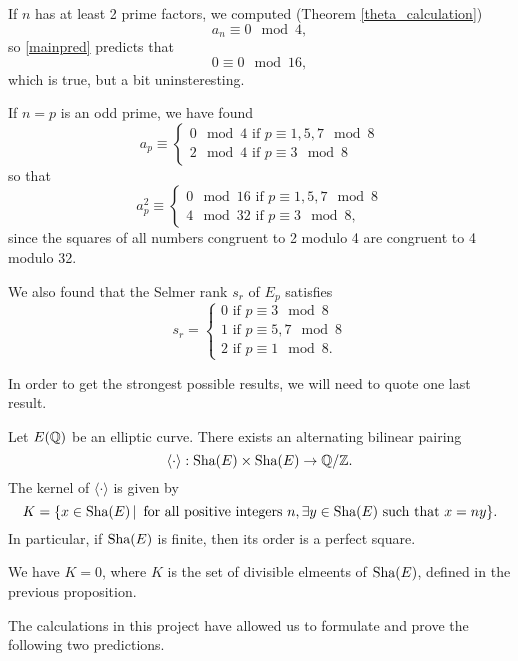 \documentclass[12pt, a4paper]{report}
\begin{document}
If $n$ has at least 2 prime factors, we computed (Theorem \autoref{theta_calculation})
\[a_n \equiv 0 \mod{4},\]
so \autoref{mainpred} predicts that
\[0 \equiv 0 \mod{16},\]
which is true, but a bit uninsteresting.

If $n = p$ is an odd prime, we have found
\[a_p \equiv \begin{cases}
    0 \mod{4} \text{ if } p \equiv 1,5,7 \mod{8} \\
    2 \mod{4} \text{ if } p \equiv 3 \mod{8}
  \end{cases}
\]
so that
\[a_p^2 \equiv
  \begin{cases}
    0 \mod{16} \text{ if } p \equiv 1,5,7 \mod{8} \\
    4 \mod {32} \text{ if } p \equiv 3 \mod{8},
  \end{cases}
\]
since the squares of all numbers congruent to 2 modulo 4 are congruent to 4
modulo 32.

We also found that the Selmer rank $s_r$ of
$E_p$ satisfies
\begin{equation*}
  s_r =
  \begin{cases}
    0 \text{ if } p \equiv 3 \mod{8} \\
    1 \text{ if } p \equiv 5,7 \mod{8} \\
    2 \text{ if } p \equiv 1 \mod{8}.
  \end{cases}
\end{equation*}

In order to get the strongest possible results, we will need to quote one last
result.
\begin{prop}
  Let $E({\mathbb Q})$ be an elliptic curve. There exists an alternating bilinear
  pairing
  \[\langle \cdot \rangle : \text{\normalfont Sha}(E) \times \text{\normalfont Sha}(E) \rightarrow {\mathbb Q} / {\mathbb Z}.\]
  The kernel of $\langle \cdot \rangle$ is given by 
  \[K = \{ x \in \text{\normalfont Sha}(E) \, | \, \textnormal{ for all positive integers } n, 
    \exists y \in \text{\normalfont Sha}(E) \textnormal{ such that } x = ny\}.\]
  In particular, if $\text{\normalfont Sha}(E)$ is finite, then its order is a perfect square. 
\end{prop}

\begin{conj} \label{cassels_conj}
  We have $K = 0$, where $K$ is the set of divisible elmeents of $\text{\normalfont Sha}(E)$,
  defined in the previous proposition.
\end{conj}

The calculations in this project have allowed us to formulate and prove the
following two predictions.
\end{document}
